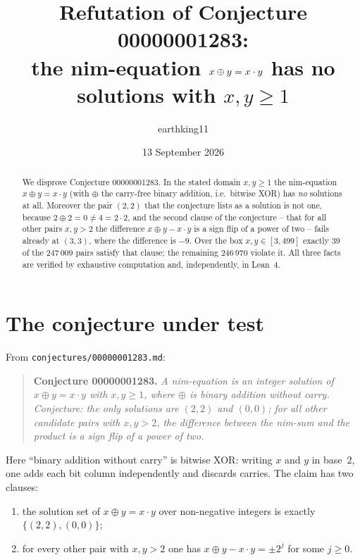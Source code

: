 \documentclass[11pt]{article}
\title{Refutation of Conjecture 00000001283:\\
the nim-equation $x \xor y = x \cdot y$ has no solutions with $x, y \ge 1$}
\author{earthking11}
\date{13 September 2026}
\theoremstyle{definition}
\newcommand{\xor}{\oplus}
\begin{document}
\maketitle

\begin{abstract}
We disprove Conjecture 00000001283.  In the stated domain $x, y \ge 1$ the
nim-equation $x \xor y = x \cdot y$ (with $\xor$ the carry-free binary
addition, i.e.\ bitwise XOR) has \emph{no} solutions at all.  Moreover the
pair $(2,2)$ that the conjecture lists as a solution is not one, because
$2 \xor 2 = 0 \ne 4 = 2 \cdot 2$, and the second clause of the conjecture --
that for all other pairs $x, y > 2$ the difference $x \xor y - x \cdot y$ is a
sign flip of a power of two -- fails already at $(3,3)$, where the difference
is $-9$.  Over the box $x, y \in [3, 499]$ exactly $39$ of the $247\,009$
pairs satisfy that clause; the remaining $246\,970$ violate it.  All three
facts are verified by exhaustive computation and, independently, in Lean~4.
\end{abstract}

\section{The conjecture under test}\label{sec:conjecture}

From \texttt{conjectures/00000001283.md}:

\begin{quote}
\textbf{Conjecture 00000001283.} \emph{A nim-equation is an integer solution
of $x \xor y = x \cdot y$ with $x, y \ge 1$, where $\xor$ is binary addition
without carry.  Conjecture: the only solutions are $(2,2)$ and $(0,0)$; for
all other candidate pairs with $x, y > 2$, the difference between the
nim-sum and the product is a sign flip of a power of two.}
\end{quote}

Here ``binary addition without carry'' is bitwise XOR: writing $x$ and $y$ in
base~$2$, one adds each bit column independently and discards carries.  The
claim has two clauses:

\begin{enumerate}
  \item[(C1)] the solution set of $x \xor y = x \cdot y$ over non-negative
    integers is exactly $\{(2,2), (0,0)\}$;
  \item[(C2)] for every other pair with $x, y > 2$ one has
    $x \xor y - x \cdot y = \pm 2^{j}$ for some $j \ge 0$.
\end{enumerate}
\end{document}
